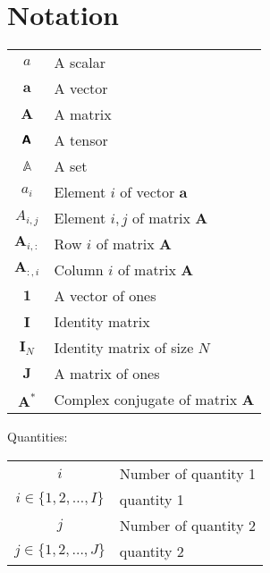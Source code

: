
\chapter*{Notation}\label{ch:notation}

\begin{center}
    \begin{tabular}{ c l }
        $a$ & A scalar \\
        $\bm{a}$ & A vector \\
        $\bm{A}$ & A matrix \\
        $\textbf{\textsf{A}}$ & A tensor \\
        $\mathbb{A}$ & A set \\

        $a_i$ & Element $i$ of vector $\bm{a}$ \\

        $A_{i, j}$ & Element $i, j$ of matrix $\bm{A}$ \\
        $\bm{A}_{i,:}$ & Row $i$ of matrix $\bm{A}$ \\
        $\bm{A}_{:,i}$ & Column $i$ of matrix $\bm{A}$ \\

        $\bm{1}$ & A vector of ones \\
        $\bm{I}$ & Identity matrix \\
        $\bm{I}_N$ & Identity matrix of size $N$ \\
        $\bm{J}$ & A matrix of ones \\
        $\bm{A}^*$ & Complex conjugate of matrix $\bm{A}$ \\
    \end{tabular}
\end{center}

Quantities:

\begin{center}
    \begin{tabular}{ c l }
        $i$ & Number of quantity 1 \\
        $i \in \{ 1, 2, \ldots, I \}$ & quantity 1 \\
        $j$ & Number of quantity 2 \\
        $j \in \{ 1, 2, \ldots, J \}$ & quantity 2
    \end{tabular}
\end{center}

